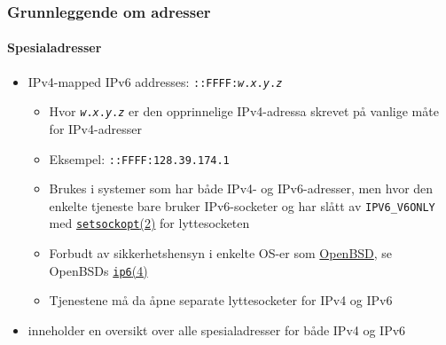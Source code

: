 \begin{frame}%
  \frametitle{Grunnleggende om adresser}
  \framesubtitle{Spesialadresser}
  \begin{itemize}[<+->]
  \item IPv4-mapped IPv6 addresses:
    \texttt{::FFFF:\textit{w}.\textit{x}.\textit{y}.\textit{z}}
    \begin{itemize}[<+->]
    \item Hvor \texttt{\textit{w}.\textit{x}.\textit{y}.\textit{z}} er
      den opprinnelige IPv4-adressa skrevet på vanlige måte for IPv4-adresser
    \item Eksempel: \texttt{::FFFF:128.39.174.1}
    \item Brukes i systemer som har både IPv4- og IPv6-adresser, men
      hvor den enkelte tjeneste bare bruker IPv6-socketer og har slått
      av \texttt{IPV6\_V6ONLY} med
      \href{http://www.freebsd.org/cgi/man.cgi?query=setsockopt&apropos=0&sektion=2&manpath=FreeBSD+9.1-RELEASE&arch=default&format=html}{\texttt{setsockopt}(2)}
      for lyttesocketen
    \item Forbudt av sikkerhetshensyn i enkelte OS-er som
      \href{http://www.openbsd.org/}{OpenBSD}, se OpenBSDs
      \href{http://www.openbsd.org/cgi-bin/man.cgi?query=ip6&sektion=4}{\texttt{ip6}(4)}
    \item Tjenestene må da åpne separate lyttesocketer for IPv4 og
      IPv6
    \end{itemize}
  \item {} inneholder en oversikt over alle spesialadresser
    for både IPv4 og IPv6
  \end{itemize}
\end{frame}

